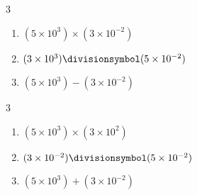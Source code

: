 \documentclass[main.tex]{subfiles}
\begin{document}
\begin{example}\hfill 
	
	\begin{multicols}{3}
		\begin{enumerate}[label={$\Alph*=$},leftmargin=*] 
			\item\rule[-0.6em]{0em}{2.1em} $(5\times 10^{3}) \times (3\times 10^{-2}) $
			\item\rule[-0.6em]{0em}{2.1em} $(3\times 10^{3}) \divisionsymbol (5\times 10^{-2}) $
			\item\rule[-0.6em]{0em}{2.1em} $(5\times 10^{3}) - (3\times 10^{-2}) $ 
		\end{enumerate}
	\end{multicols} 
	\vfill  
	\begin{multicols}{3}
		\begin{enumerate}[label={$\Alph*=$},leftmargin=*] 
			\item\rule[-0.6em]{0em}{2.4em} $(5\times 10^{3}) \times (3\times 10^{2}) $
			\item\rule[-0.6em]{0em}{2.1em} $(3\times 10^{-2}) \divisionsymbol (5\times 10^{-2}) $	
			\item\rule[-0.6em]{0em}{2.1em} $(5\times 10^{3}) + (3\times 10^{-2}) $
		\end{enumerate}
	\end{multicols} 
	\vfill 	
\end{example} 
\end{document}

